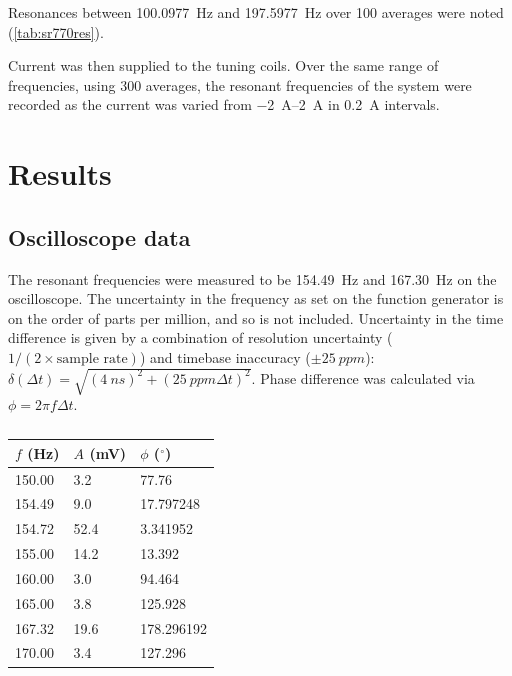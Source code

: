 \documentclass{article}
\begin{document}
Resonances between \qty{100.0977}{Hz} and \qty{197.5977}{Hz} over 100 averages were noted (\autoref{tab:sr770res}).

Current was then supplied to the tuning coils. Over the same range of frequencies, using 300 averages, the resonant frequencies of the system were recorded as the current was varied from \qtyrange{-2}{2}{\ampere} in \qty{0.2}{\ampere} intervals.

\section{Results}

\subsection{Oscilloscope data}
The resonant frequencies were measured to be \qty{154.49}{Hz} and \qty{167.30}{Hz} on the oscilloscope. The uncertainty in the frequency as set on the function generator is on the order of parts per million, and so is not included. Uncertainty in the time difference is given by a combination of resolution uncertainty ($1/(2\times\text{sample rate})$) and timebase inaccuracy ($\pm\qty{25}{ppm}$):  $\delta(\Delta t) = \sqrt{\left( \qty{4}{ns} \right)^2 + \left( \qty{25}{ppm} \Delta t \right)^2}$.
Phase difference was calculated via $\phi = 2\pi f \Delta t$.

\begin{table}
  \centering
  \begin{tabular}{@{}lll@{}}
    \toprule
    $f$ (\unit{Hz}) & $A$ (\unit{\mV}) & $\phi$ ($^\circ$) \\ \midrule
    150.00    & 3.2      & 77.76      \\
    154.49   & 9.0      & 17.797248  \\
    154.72   & 52.4     & 3.341952   \\
    155.00    & 14.2     & 13.392     \\
    160.00    & 3.0      & 94.464     \\
    165.00    & 3.8      & 125.928    \\
    167.32   & 19.6     & 178.296192 \\
    170.00    & 3.4      & 127.296    \\ \bottomrule
  \end{tabular}
  \caption{}
  \label{tab:oscfa}
\end{table}
\end{document}
